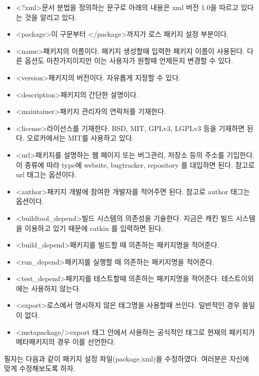 \begin{itemize}
\item \textless{?xml}\textgreater 문서 분법을 정의하는 문구로 아래의 내용은 xml 버전 1.0을 따르고 있다는 것을 알리고 있다.
\item \textless{package}\textgreater 이 구문부터 \textless/package\textgreater 까지가 로스 패키지 설정 부분이다.
\item \textless{name}\textgreater 패키지의 이름이다. 패키지 생성할때 입력한 패키지 이름이 사용된다. 다른 옵션도 마찬가지이지만 이는 사용자가 원할때 언제든지 변경할 수 있다.
\item \textless{version}\textgreater 패키지의 버전이다. 자유롭게 지정할 수 있다.
\item \textless{description}\textgreater 패키지의 간단한 설명이다. 
\item \textless{maintainer}\textgreater 패키지 관리자의 연락처를 기재한다.
\item \textless{license}\textgreater 라이선스를 기재한다. BSD, MIT, GPLv3, LGPLv3 등을 기재하면 된다. 오로카에서는 MIT를 사용하고 있다.
\item \textless{url}\textgreater 패키지를 설명하는 웹 페이지 또는 버그관리, 저장소 등의 주소를 기입한다. 이 종류에 따라 type에  website, bugtracker, repository 를 대입하면 된다. 참고로 url 태그는 옵션이다.
\item \textless{author}\textgreater 패키지 개발에 참여한 개발자를 적어주면 된다. 참고로 author 태그는 옵션이다.
\item \textless{buildtool\_depend}\textgreater 빌드 시스템의 의존성을 기술한다. 지금은 캐킨 빌드 시스템을 이용하고 있기 때문에 catkin 를 입력하면 된다.
\item \textless{build\_depend}\textgreater 패키지를 빌드할 때 의존하는 패키지명을 적어준다.
\item \textless{run\_depend}\textgreater 패키지를 실행할 때 의존하는 패키지명을 적어준다.
\item \textless{test\_depend}\textgreater 패키지를 테스트할때 의존하는 패키지명을 적어준다. 테스트이외에는 사용하지 않는다.
\item \textless{export}\textgreater 로스에서 명시하지 않은 태그명을 사용할때 쓰인다. 일반적인 경우 쓸일이 없다.
\item \textless{metapackage/}\textgreater export 태그 안에서 사용하는 공식적인 태그로 현재의 패키지가 메타패키지의 경우 이를 선언한다.
\end{itemize}

\noindent
필자는 다음과 같이 패키지 설정 파일(package.xml)을 수정하였다. 여러분은 자신에 맞게 수정해보도록 하자.

